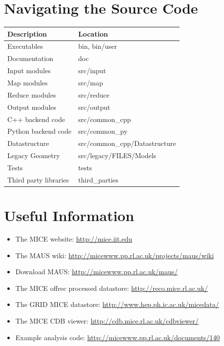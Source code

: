 \documentclass[a4paper,10pt]{article}
\begin{document}
\section{Navigating the Source Code}

\begin{small}
\noindent
  \renewcommand{\arraystretch}{1.5}
  \begin{tabular}{| l | l |}
    \hline
    \textbf{Description} & \textbf{Location} \\
    \hline
    Executables & bin, bin/user \\
    Documentation & doc \\
    Input modules & src/input \\
    Map modules & src/map \\
    Reduce modules & src/reduce \\
    Output modules & src/output \\
    C++ backend code & src/common\_cpp \\
    Python backend code & src/common\_py \\
    Datastructure & src/common\_cpp/Datastructure \\
    Legacy Geometry & src/legacy/FILES/Models \\
    Tests & tests \\
    Third party libraries & third\_parties \\
    \hline
  \end{tabular}
  \renewcommand{\arraystretch}{1.0}
\end{small}


\section{Useful Information}
\label{sec:UsefulInformation}
  \begin{itemize}
    \item The MICE website: \url{http://mice.iit.edu}
    \item The MAUS wiki: \url{http://micewww.pp.rl.ac.uk/projects/maus/wiki}
    \item Download MAUS: \url{http://micewww.pp.rl.ac.uk/maus/}
    \item The MICE offrec processed datastore: \url{http://reco.mice.rl.ac.uk/}
    \item The GRID MICE datastore: \url{http://www.hep.ph.ic.ac.uk/micedata/}
    \item The MICE CDB viewer: \url{http://cdb.mice.rl.ac.uk/cdbviewer/}
    \item Example analysis code: \url{http://micewww.pp.rl.ac.uk/documents/140}
  \end{itemize}
\end{document}

